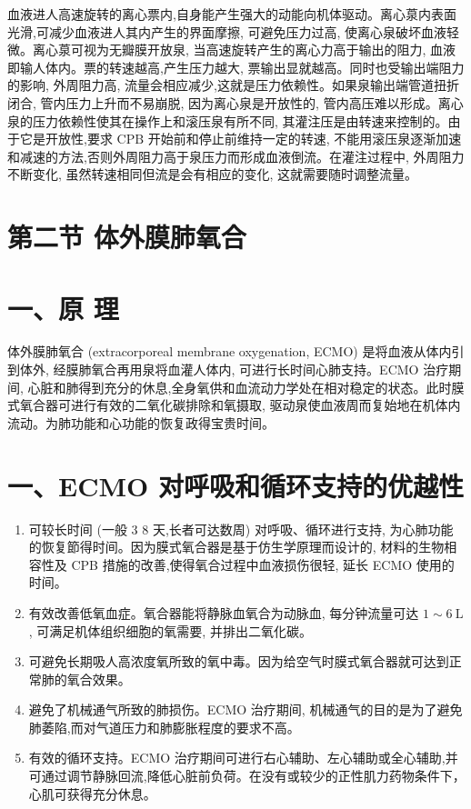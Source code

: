 \documentclass[10pt]{article}
\begin{document}
血液进人高速旋转的离心票内,自身能产生强大的动能向机体驱动。离心葲内表面光滑,可减少血液进人其内产生的界面摩擦, 可避免压力过高, 使离心泉破坏血液轻微。离心葲可视为无瓣膜开放泉, 当高速旋转产生的离心力高于输出的阻力, 血液即输人体内。票的转速越高,产生压力越大, 票输出显就越高。同时也受输出端阻力的影响, 外周阻力高, 流量会相应减少,这就是压力依赖性。如果泉输出端管道扭折闭合, 管内压力上升而不易崩脱, 因为离心泉是开放性的, 管内高压难以形成。离心泉的压力依赖性使其在操作上和滚压泉有所不同, 其灌注压是由转速来控制的。由于它是开放性,要求 $\mathrm{CPB}$ 开始前和停止前维持一定的转速, 不能用滚压泉逐渐加速和减速的方法,否则外周阻力高于泉压力而形成血液倒流。在灌注过程中, 外周阻力不断变化, 虽然转速相同但流是会有相应的变化, 这就需要随时调整流量。

\section*{第二节 体外膜肺氧合}
\section*{一、原 理}
体外膜肺氧合 (extracorporeal membrane oxygenation, ECMO) 是将血液从体内引到体外, 经膜肺氧合再用泉将血灌人体内, 可进行长时间心肺支持。ECMO 治疗期间, 心脏和肺得到充分的休息,全身氧供和血流动力学处在相对稳定的状态。此时膜式氧合器可进行有效的二氧化碳排除和氧摄取, 驱动泉使血液周而复始地在机体内流动。为肺功能和心功能的恢复政得宝贵时间。

\section*{一、ECMO 对呼吸和循环支持的优越性}
\begin{enumerate}
  \item 可较长时间 (一般 3 8 天,长者可达数周) 对呼吸、循环进行支持, 为心肺功能的恢复節得时间。因为膜式氧合器是基于仿生学原理而设计的, 材料的生物相容性及 CPB 措施的改善,使得氧合过程中血液损伤很轻, 延长 ECMO 使用的时间。

  \item 有效改善低氧血症。氧合器能将静脉血氧合为动脉血, 每分钟流量可达 $1 \sim 6 \mathrm{~L}$, 可满足机体组织细胞的氧需要, 并排出二氧化碳。

  \item 可避免长期吸人高浓度氧所致的氧中毒。因为给空气时膜式氧合器就可达到正常肺的氧合效果。

  \item 避免了机械通气所致的肺损伤。ECMO 治疗期间, 机械通气的目的是为了避免肺萎陷,而对气道压力和肺膨胀程度的要求不高。

  \item 有效的循环支持。ECMO 治疗期间可进行右心辅助、左心辅助或全心辅助,并可通过调节静脉回流,降低心脏前负荷。在没有或较少的正性肌力药物条件下，心肌可获得充分休息。

\end{enumerate}
\end{document}
